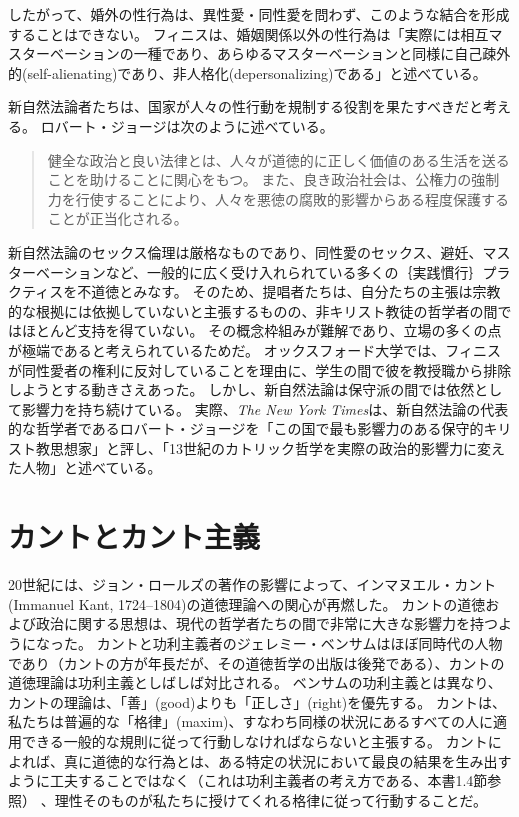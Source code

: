 \documentclass[paper=a4,book,openany]{jlreq}
\begin{document}
したがって、婚外の性行為は、異性愛・同性愛を問わず、このような結合を形成することはできない。
フィニスは、婚姻関係以外の性行為は「実際には相互マスターベーションの一種であり、あらゆるマスターベーションと同様に自己疎外的(self-alienating)であり、非人格化(depersonalizing)である」と述べている\citep[p.1066]{finnis94:_law_moral_sexual_orien}。

新自然法論者たちは、国家が人々の性行動を規制する役割を果たすべきだと考える。
ロバート・ジョージは次のように述べている。

\begin{quote}
健全な政治と良い法律とは、人々が道徳的に正しく価値のある生活を送ることを助けることに関心をもつ。
また、良き政治社会は、公権力の強制力を行使することにより、人々を悪徳の腐敗的影響からある程度保護することが正当化される。
\citep[p.20]{george93:_makin_men_moral}
\end{quote}

新自然法論のセックス倫理は厳格なものであり、同性愛のセックス、避妊、マスターベーションなど、一般的に広く受け入れられている多くの｛実践慣行｝{プラクティス}を不道徳とみなす。
そのため、提唱者たちは、自分たちの主張は宗教的な根拠には依拠していないと主張するものの、非キリスト教徒の哲学者の間ではほとんど支持を得ていない。
その概念枠組みが難解であり、立場の多くの点が極端であると考えられているためだ。
オックスフォード大学では、フィニスが同性愛者の権利に反対していることを理由に、学生の間で彼を教授職から排除しようとする動きさえあった\citep{benn19:_we_dont_think_john_finnis}。
しかし、新自然法論は保守派の間では依然として影響力を持ち続けている。
実際、\emph{The New York Times}は、新自然法論の代表的な哲学者であるロバート・ジョージを「この国で最も影響力のある保守的キリスト教思想家」と評し、「13世紀のカトリック哲学を実際の政治的影響力に変えた人物」と述べている\citep{kirkpatrick09:_conser_chris_big_think}。

\section{カントとカント主義}

20世紀には、ジョン・ロールズの著作の影響によって、インマヌエル・カント(Immanuel Kant, 1724--1804)の道徳理論への関心が再燃した。
カントの道徳および政治に関する思想は、現代の哲学者たちの間で非常に大きな影響力を持つようになった。
カントと功利主義者のジェレミー・ベンサムはほぼ同時代の人物であり（カントの方が年長だが、その道徳哲学の出版は後発である）、カントの道徳理論は功利主義としばしば対比される。
ベンサムの功利主義とは異なり、カントの理論は、「善」(good)よりも「正しさ」(right)を優先する。
カントは、私たちは普遍的な「格律」(maxim)、すなわち同様の状況にあるすべての人に適用できる一般的な規則に従って行動しなければならないと主張する。
カントによれば、真に道徳的な行為とは、ある特定の状況において最良の結果を生み出すように工夫することではなく（これは功利主義者の考え方である、本書1.4節参照） 、理性そのものが私たちに授けてくれる格律に従って行動することだ。
\end{document}
